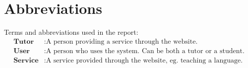 \chapter*{Abbreviations}
Terms and abbreviations used in the report:
\begin{align*}
    \textbf{Tutor} &: \text{A person providing a service through the website.} \\
    \textbf{User} &: \text{A person who uses the system. Can be both a tutor or a student.} \\
    \textbf{Service} &: \text{A service provided through the website, eg. teaching a language.} \\
\end{align*}
